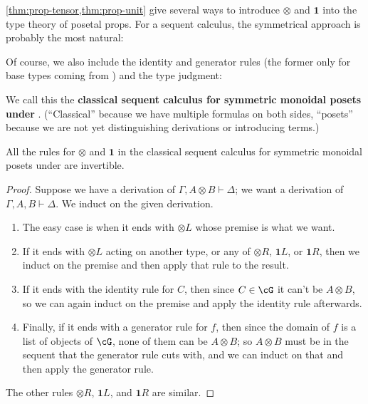 \documentclass{book}
\let\types\vdash
\def\type{\;\ftype}
\def\unit{\mathbf{1}}
\def\one{\mathbf{1}}
\let\tensor\otimes
\def\tensorL{\mathord{\tensor}L}
\def\tensorR{\mathord{\tensor}R}
\begin{document}
\cref{thm:prop-tensor,thm:prop-unit} give several ways to introduce $\tensor$ and $\unit$ into the type theory of posetal props.
For a sequent calculus, the symmetrical approach is probably the most natural:
Of course, we also include the identity and generator rules (the former only for base types coming from \cG) and the type judgment:
We call this the \textbf{classical sequent calculus for symmetric monoidal posets under \cG}.
(``Classical'' because we have multiple formulas on both sides, ``posets'' because we are not yet distinguishing derivations or introducing terms.)

\begin{thm}\label{thm:seqcalc-smpos-invertible}
  All the rules for $\tensor$ and $\one$ in the classical sequent calculus for symmetric monoidal posets under \cG are invertible.
\end{thm}
\begin{proof}
  Suppose we have a derivation of $\Gamma,A\tensor B\types \Delta$; we want a derivation of $\Gamma,A,B\types \Delta$.
  We induct on the given derivation.
  \begin{enumerate}
  \item The easy case is when it ends with $\tensorL$ whose premise is what we want.
  \item If it ends with $\tensorL$ acting on another type, or any of $\tensorR$, $\one L$, or $\one R$, then we induct on the premise and then apply that rule to the result.
  \item If it ends with the identity rule for $C$, then since $C\in \cG$ it can't be $A\tensor B$, so we can again induct on the premise and apply the identity rule afterwards.
  \item Finally, if it ends with a generator rule for $f$, then since the domain of $f$ is a list of objects of $\cG$, none of them can be $A\tensor B$; so $A\tensor B$ must be in the sequent that the generator rule cuts with, and we can induct on that and then apply the generator rule.
  \end{enumerate}
  The other rules $\tensorR$, $\one L$, and $\one R$ are similar.
\end{proof}
\end{document}

